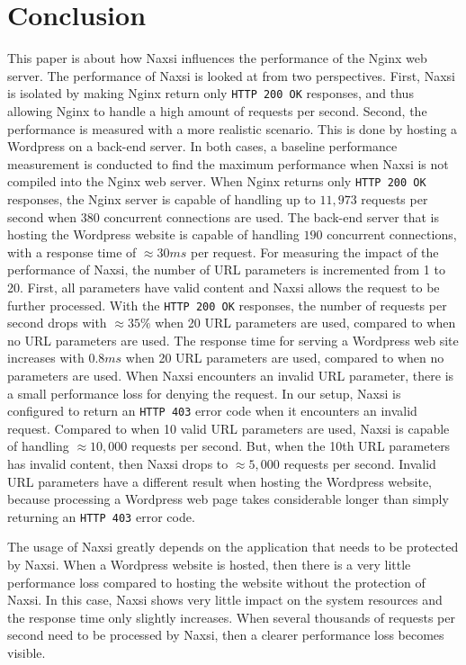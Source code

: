 \documentclass[Conclusion]{subfiles}
\begin{document}
\section{Conclusion}
\label{sec:Conclusion}
This paper is about how Naxsi influences the performance of the \mbox{Nginx} web server. The performance of Naxsi is looked at from two perspectives. First, Naxsi is isolated by making Nginx return only \verb+HTTP 200 OK+ responses, and thus allowing Nginx to handle a high amount of requests per second. Second, the performance is measured with a more realistic scenario. This is done by hosting a Wordpress on a back-end server. In both cases, a baseline performance measurement is conducted to find the maximum performance when Naxsi is not compiled into the Nginx web server. When Nginx returns only \verb+HTTP 200 OK+ responses, the Nginx server is capable of handling up to $11,973$ requests per second when $380$ concurrent connections are used. The back-end server that is hosting the Wordpress website is capable of handling $190$ concurrent connections, with a response time of $\approx 30 ms$ per request. For measuring the impact of the performance of Naxsi, the number of URL parameters is incremented from 1 to 20. First, all parameters have valid content and Naxsi allows the request to be further processed. With the \verb+HTTP 200 OK+ responses, the number of requests per second drops with $\approx 35\%$ when 20 URL parameters are used, compared to when no URL parameters are used. The response time for serving a Wordpress web site increases with $0.8 ms$ when 20 URL parameters are used, compared to when no parameters are used. When Naxsi encounters an invalid URL parameter, there is a small performance loss for denying the request. In our setup, Naxsi is configured to return an \verb+HTTP 403+ error code when it encounters an invalid request. Compared to when 10 valid URL parameters are used, Naxsi is capable of handling $\approx 10,000$ requests per second. But, when the 10th URL parameters has invalid content, then Naxsi drops to $\approx 5,000$ requests per second. Invalid URL parameters have a different result when hosting the Wordpress website, because processing a Wordpress web page takes considerable longer than simply returning an \verb+HTTP 403+ error code.

The usage of Naxsi greatly depends on the application that needs to be protected by Naxsi. When a Wordpress website is hosted, then there is a very little performance loss compared to hosting the website without the protection of Naxsi. In this case, Naxsi shows very little impact on the system resources and the response time only slightly increases. When several thousands of requests per second need to be processed by Naxsi, then a clearer performance loss becomes visible. 
\end{document}
